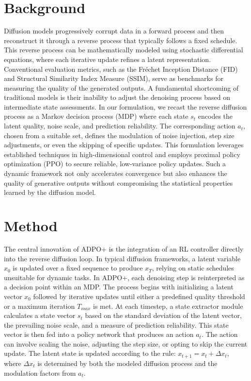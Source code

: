 \documentclass{article} %
\begin{document}
\section{Background}
\label{sec:background}
Diffusion models progressively corrupt data in a forward process and then reconstruct it through a reverse process that typically follows a fixed schedule. This reverse process can be mathematically modeled using stochastic differential equations, where each iterative update refines a latent representation. Conventional evaluation metrics, such as the Fr\'echet Inception Distance (FID) and Structural Similarity Index Measure (SSIM), serve as benchmarks for measuring the quality of the generated outputs. A fundamental shortcoming of traditional models is their inability to adjust the denoising process based on intermediate state assessments. In our formulation, we recast the reverse diffusion process as a Markov decision process (MDP) where each state \(s_t\) encodes the latent quality, noise scale, and prediction reliability. The corresponding action \(a_t\), chosen from a suitable set, defines the modulation of noise injection, step size adjustments, or even the skipping of specific updates. This formulation leverages established techniques in high-dimensional control and employs proximal policy optimization (PPO) to secure reliable, low-variance policy updates. Such a dynamic framework not only accelerates convergence but also enhances the quality of generative outputs without compromising the statistical properties learned by the diffusion model.

\section{Method}
\label{sec:method}
The central innovation of ADPO+ is the integration of an RL controller directly into the reverse diffusion loop. In typical diffusion frameworks, a latent variable \(x_0\) is updated over a fixed sequence to produce \(x_T\), relying on static schedules unsuitable for dynamic tasks. In ADPO+, each denoising step is reinterpreted as a decision point within an MDP. The process begins with initializing a latent vector \(x_0\) followed by iterative updates until either a predefined quality threshold or a maximum iteration \(T_{max}\) is met. At each timestep, a state extractor module calculates a state vector \(s_t\) based on the standard deviation of the latent vector, the prevailing noise scale, and a measure of prediction reliability. This state vector is then fed into a policy network that produces an action \(a_t\). The action can involve scaling the noise, adjusting the step size, or opting to skip the current update. The latent state is updated according to the rule: \(x_{t+1} = x_t + \Delta x_t\), where \(\Delta x_t\) is determined by both the modeled diffusion process and the modulation factors from \(a_t\).
\end{document}
